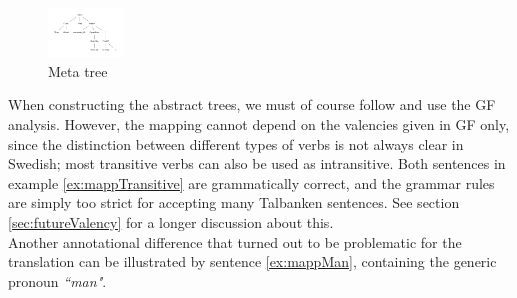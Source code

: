 \documentclass{report}
\begin{document}
\begin{figure}
\includegraphics[width=20mm]{metatree.pdf}
\caption{Meta tree}
\label{pic:gfEtree}
\end{figure}
When constructing the abstract trees, we must of course follow and use the
GF analysis. However,
the mapping cannot depend on the valencies given in GF only, 
since the distinction between different types of verbs is not always clear in Swedish;
most transitive verbs can also be used as intransitive. Both sentences in
example \ref{ex:mappTransitive} are grammatically correct, and
the grammar rules are simply too strict for accepting many Talbanken sentences.
\label{ex:mappTransitive}
See section \ref{sec:futureValency} for a longer discussion about this.\\

Another annotational difference that turned out to be problematic for the
translation can be illustrated by sentence \ref{ex:mappMan}, containing
the generic pronoun \emph{``man"}.
\label{ex:mappMan} %
\end{document}
